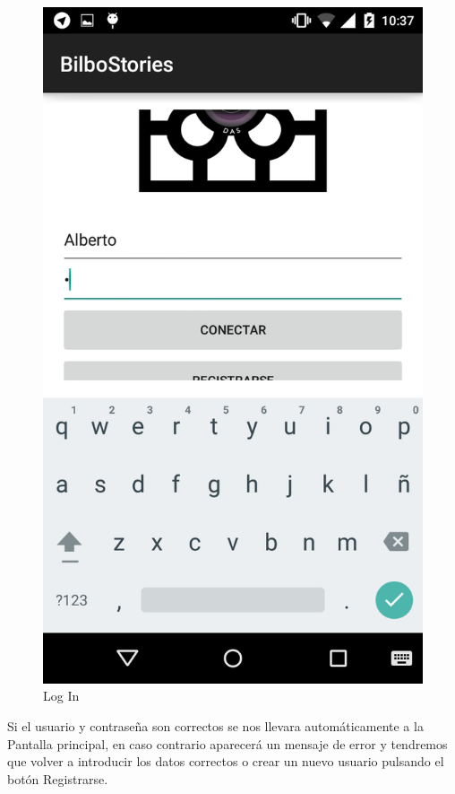 \documentclass[11pt,a4paper, titlepage]{article}
\begin{document}
	\begin{figure}[!h]
		\centering
		\includegraphics[scale = 0.25 ]{img/1}
		\caption{Log In}
		\label{login2}
	\end{figure}
	\FloatBarrier
	
	Si el usuario y contraseña son correctos se nos llevara automáticamente a la Pantalla principal, en caso contrario aparecerá un mensaje de error y tendremos que volver a introducir los datos correctos o crear un nuevo usuario pulsando el botón Registrarse.
	
\end{document}
